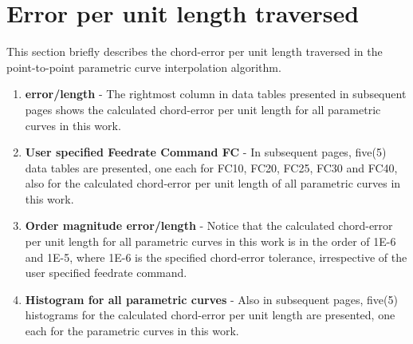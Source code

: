 \section{Error per unit length traversed}

This section briefly describes the chord-error per unit length traversed in the point-to-point parametric curve interpolation algorithm.

\begin{enumerate}
	\item \textbf{error/length} - The rightmost column in data tables presented in subsequent pages shows the calculated chord-error per unit length for all parametric curves in this work.
	
	
	\item \textbf{User specified Feedrate Command FC} - In subsequent pages, five(5) data tables are presented, one each for FC10, FC20, FC25, FC30 and FC40, also for the calculated chord-error per unit length of all parametric curves in this work.
	
	\item \textbf{Order magnitude error/length} - Notice that the calculated chord-error per unit length for all parametric curves in this work is in the order of 1E-6 and 1E-5, where 1E-6 is the specified chord-error tolerance, irrespective of the user specified feedrate command.
		
	
	\item \textbf{Histogram for all parametric curves} - Also in subsequent pages, five(5) histograms for the calculated chord-error per unit length are presented, one each for the parametric curves in this work.
	
\end{enumerate}

